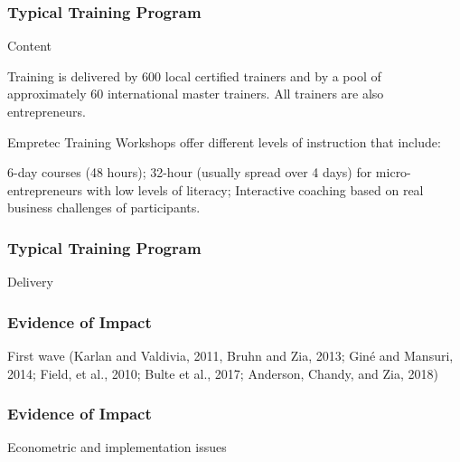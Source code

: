 \documentclass[hideothersubsections, usenames,dvipsnames,11pt]{beamer}
\newenvironment{itemize_2pt}{\itemize\addtolength{\itemsep}{2pt}}{\enditemize}
\begin{document}

\begin{frame}
\frametitle{Typical Training Program}
	Content
	\begin{itemize_2pt}
	\item Training is delivered by 600 local certified trainers and by a pool of approximately 60 international master trainers. All trainers are also entrepreneurs.
	\item Empretec Training Workshops offer different levels of instruction that include:
	\item 6-day courses (48 hours); 32-hour (usually spread over 4 days) for micro-entrepreneurs with low levels of literacy; Interactive coaching based on real business challenges of participants.
	\vspace{0.1in}
	\end{itemize_2pt}
\end{frame}

\begin{frame}
\frametitle{Typical Training Program}
	Delivery 
	\begin{itemize_2pt}
	\item %
	\vspace{0.1in}
	\end{itemize_2pt}
\end{frame}


\begin{frame}
\frametitle{Evidence of Impact}
	\begin{itemize_2pt}
	\item First wave (Karlan and Valdivia, 2011, Bruhn and Zia, 2013; Giné and Mansuri, 2014; Field, et al., 2010; Bulte et al., 2017; Anderson, Chandy, and Zia, 2018)
					 \citep{Karlan2011} \citep{Field2010} \citet{Gine2014} \citep{Bruhn2013} \citep{Bulte2017} \citep{Anderson2018}
	\vspace{0.1in}
	\end{itemize_2pt}
\end{frame}

\begin{frame}
\frametitle{Evidence of Impact}
	\begin{itemize_2pt}
	\item Econometric and implementation issues \citep{McKenzie2014}
	\vspace{0.1in}
	\end{itemize_2pt}
\end{frame}
\end{document}
